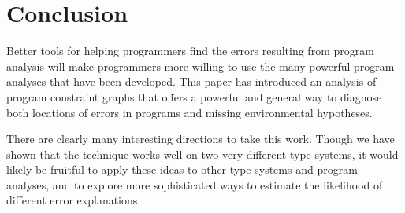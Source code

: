 
\section{Conclusion}

Better tools for helping programmers find the errors resulting from
program analysis will make programmers more willing to use the many
powerful program analyses that have been developed. This paper has
introduced an analysis of program constraint graphs that offers a
powerful and general way to diagnose both locations of errors in
programs and missing environmental hypotheses.

There are clearly many interesting directions to take this work.
Though we have shown that the technique works well on two very
different type systems, it would likely be fruitful to apply these
ideas to other type systems and program analyses, and to explore more
sophisticated ways to estimate the likelihood of different error
explanations.





